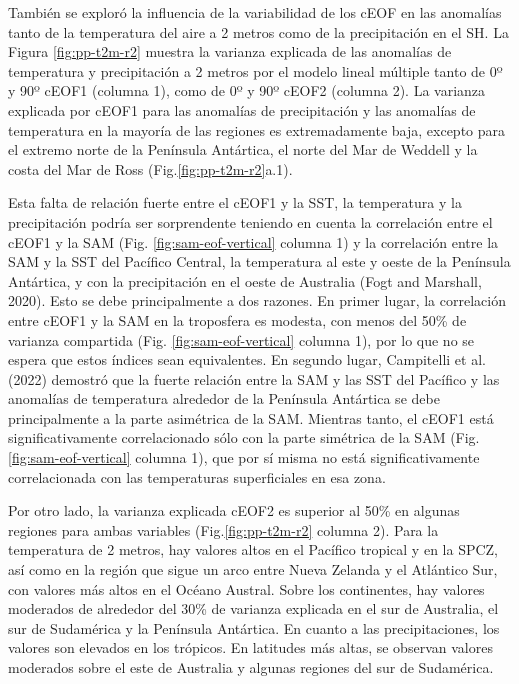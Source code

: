 \documentclass[12pt,oneside]{reedthesis}
\begin{document}
También se exploró la influencia de la variabilidad de los cEOF en las anomalías tanto de la temperatura del aire a 2 metros como de la precipitación en el SH.
La Figura \ref{fig:pp-t2m-r2} muestra la varianza explicada de las anomalías de temperatura y precipitación a 2 metros por el modelo lineal múltiple tanto de 0º y 90º cEOF1 (columna 1), como de 0º y 90º cEOF2 (columna 2).
La varianza explicada por cEOF1 para las anomalías de precipitación y las anomalías de temperatura en la mayoría de las regiones es extremadamente baja, excepto para el extremo norte de la Península Antártica, el norte del Mar de Weddell y la costa del Mar de Ross (Fig.\ref{fig:pp-t2m-r2}a.1).

Esta falta de relación fuerte entre el cEOF1 y la SST, la temperatura y la precipitación podría ser sorprendente teniendo en cuenta la correlación entre el cEOF1 y la SAM (Fig. \ref{fig:sam-eof-vertical} columna 1) y la correlación entre la SAM y la SST del Pacífico Central, la temperatura al este y oeste de la Península Antártica, y con la precipitación en el oeste de Australia (Fogt and Marshall, 2020).
Esto se debe principalmente a dos razones.
En primer lugar, la correlación entre cEOF1 y la SAM en la troposfera es modesta, con menos del 50\% de varianza compartida (Fig. \ref{fig:sam-eof-vertical} columna 1), por lo que no se espera que estos índices sean equivalentes.
En segundo lugar, Campitelli et al. (2022) demostró que la fuerte relación entre la SAM y las SST del Pacífico y las anomalías de temperatura alrededor de la Península Antártica se debe principalmente a la parte asimétrica de la SAM.
Mientras tanto, el cEOF1 está significativamente correlacionado sólo con la parte simétrica de la SAM (Fig. \ref{fig:sam-eof-vertical} columna 1), que por sí misma no está significativamente correlacionada con las temperaturas superficiales en esa zona.

Por otro lado, la varianza explicada cEOF2 es superior al 50\% en algunas regiones para ambas variables (Fig.\ref{fig:pp-t2m-r2} columna 2).
Para la temperatura de 2 metros, hay valores altos en el Pacífico tropical y en la SPCZ, así como en la región que sigue un arco entre Nueva Zelanda y el Atlántico Sur, con valores más altos en el Océano Austral.
Sobre los continentes, hay valores moderados de alrededor del 30\% de varianza explicada en el sur de Australia, el sur de Sudamérica y la Península Antártica.
En cuanto a las precipitaciones, los valores son elevados en los trópicos.
En latitudes más altas, se observan valores moderados sobre el este de Australia y algunas regiones del sur de Sudamérica.
\end{document}
